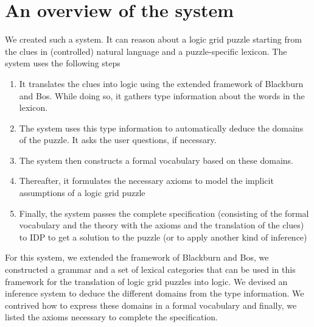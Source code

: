 \section{An overview of the system}
We created such a system. It can reason about a logic grid puzzle starting from the clues in (controlled) natural language and a puzzle-specific lexicon. The system uses the following steps
\begin{enumerate}
  \item It translates the clues into logic using the extended framework of Blackburn and Bos. While doing so, it gathers type information about the words in the lexicon.
  \item The system uses this type information to automatically deduce the domains of the puzzle. It asks the user questions, if necessary.
  \item The system then constructs a formal vocabulary based on these domains.
  \item Thereafter, it formulates the necessary axioms to model the implicit assumptions of a logic grid puzzle
  \item Finally, the system passes the complete specification (consisting of the formal vocabulary and the theory with the axioms and the translation of the clues) to IDP \cite{IDP} to get a solution to the puzzle (or to apply another kind of inference)
\end{enumerate}

For this system, we extended the framework of Blackburn and Bos, we constructed a grammar and a set of lexical categories that can be used in this framework for the translation of logic grid puzzles into logic. We devised an inference system to deduce the different domains from the type information. We contrived how to express these domains in a formal vocabulary and finally, we listed the axioms necessary to complete the specification.



